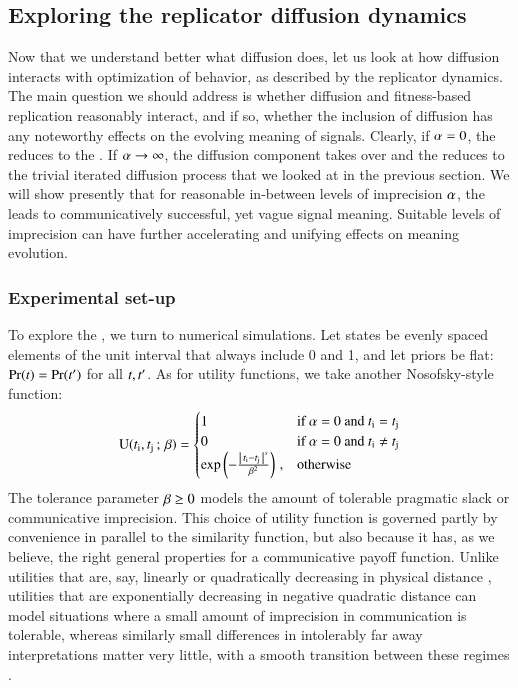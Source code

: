 \subsection{Exploring the replicator diffusion dynamics}
\label{sec:simulations}

Now that we understand better what diffusion does, let us look at how
diffusion interacts with optimization of behavior, as described by the
replicator dynamics. The main question we should address is whether
diffusion and fitness-based replication reasonably interact, and if
so, whether the inclusion of diffusion has any noteworthy effects on
the evolving meaning of signals. Clearly, if $\alpha = 0$, the
\rdd reduces to the \rd. If $\alpha \rightarrow \infty$, the
diffusion component takes over and the \rdd reduces to the trivial
iterated diffusion process that we looked at in the previous
section. We will show presently that for reasonable in-between levels
of imprecision $\alpha$, the \rdd leads to communicatively
successful, yet vague signal meaning. Suitable levels of imprecision
can have further accelerating and unifying effects on meaning
evolution.

\subsubsection{Experimental set-up}

To explore the \rdd, we turn to numerical simulations. Let states be
evenly spaced elements of the unit interval that always include 0 and
1, and let priors be flat: $\Pr(t) = \Pr(t')$ for all
$t, t'$. As for utility functions, we take another
Nosofsky-style function:
\begin{align}
  \label{eq:NosofskyUtil}
  \mathrm{U}(t_{\mathrm{i}}, t_{\mathrm{j}} \thinspace ; \thinspace \beta) =
      \begin{cases}
    1 & \textrm{if } \alpha = 0 \textrm{ and } t_{\mathrm{i}} = t_{\mathrm{j}} \\
    0 & \textrm{if } \alpha = 0 \textrm{ and } t_{\mathrm{i}} \neq t_{\mathrm{j}} \\
 \operatorname{exp} \left ( -  \frac{\left \lvert \, t_{\mathrm{i}} - t_{\mathrm{j}} \, \right\rvert^s}{ \beta^2} \right ) \,,& \textrm{otherwise} \\
    \end{cases}
\end{align}
The tolerance parameter $\beta \ge 0$ models the amount of tolerable
pragmatic slack or communicative imprecision. This choice of utility
function is governed partly by convenience in parallel to the
similarity function, but also because it has, as we believe, the right
general properties for a communicative payoff function. Unlike
utilities that are, say, linearly or quadratically decreasing in
physical distance \citep[c.f.][]{JagerMetzger2011:Voronoi-Languag,FrankeJager2010:Vagueness-Signa},
utilities that are exponentially decreasing in negative quadratic
distance can model situations where a small amount of imprecision in
communication is tolerable, whereas similarly small differences in
intolerably far away interpretations matter very little, with a smooth
transition between these regimes
\citep[c.f.][]{OConnor2013:The-Evolution-o}.

